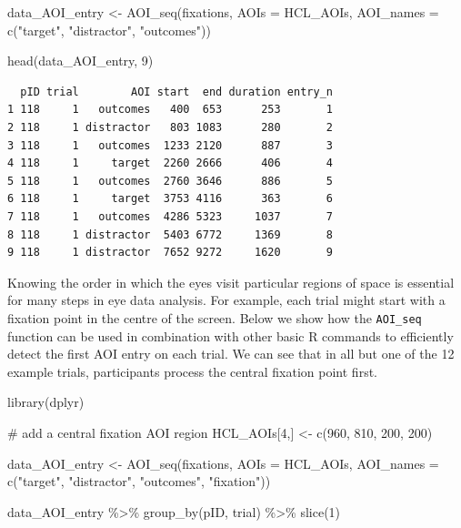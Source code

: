 \documentclass[
  man,
  floatsintext,
  longtable,
  nolmodern,
  notxfonts,
  notimes,
  colorlinks=true,linkcolor=blue,citecolor=blue,urlcolor=blue]{apa7}
\newenvironment{Shaded}{\begin{snugshade}}{\end{snugshade}}
\newcommand{\AttributeTok}[1]{\textcolor[rgb]{0.40,0.45,0.13}{#1}}
\newcommand{\CommentTok}[1]{\textcolor[rgb]{0.37,0.37,0.37}{#1}}
\newcommand{\DecValTok}[1]{\textcolor[rgb]{0.68,0.00,0.00}{#1}}
\newcommand{\FunctionTok}[1]{\textcolor[rgb]{0.28,0.35,0.67}{#1}}
\newcommand{\NormalTok}[1]{\textcolor[rgb]{0.00,0.23,0.31}{#1}}
\newcommand{\OtherTok}[1]{\textcolor[rgb]{0.00,0.23,0.31}{#1}}
\newcommand{\SpecialCharTok}[1]{\textcolor[rgb]{0.37,0.37,0.37}{#1}}
\newcommand{\StringTok}[1]{\textcolor[rgb]{0.13,0.47,0.30}{#1}}
\begin{document}
\begin{Shaded}
\begin{Highlighting}[]
\NormalTok{data\_AOI\_entry }\OtherTok{\textless{}{-}} 
  \FunctionTok{AOI\_seq}\NormalTok{(fixations, }
          \AttributeTok{AOIs =}\NormalTok{ HCL\_AOIs,}
          \AttributeTok{AOI\_names =} \FunctionTok{c}\NormalTok{(}\StringTok{"target"}\NormalTok{, }\StringTok{"distractor"}\NormalTok{, }\StringTok{"outcomes"}\NormalTok{))}

\FunctionTok{head}\NormalTok{(data\_AOI\_entry, }\DecValTok{9}\NormalTok{)}
\end{Highlighting}
\end{Shaded}

\begin{verbatim}
  pID trial        AOI start  end duration entry_n
1 118     1   outcomes   400  653      253       1
2 118     1 distractor   803 1083      280       2
3 118     1   outcomes  1233 2120      887       3
4 118     1     target  2260 2666      406       4
5 118     1   outcomes  2760 3646      886       5
6 118     1     target  3753 4116      363       6
7 118     1   outcomes  4286 5323     1037       7
8 118     1 distractor  5403 6772     1369       8
9 118     1 distractor  7652 9272     1620       9
\end{verbatim}

Knowing the order in which the eyes visit particular regions of space is
essential for many steps in eye data analysis. For example, each trial
might start with a fixation point in the centre of the screen. Below we
show how the \texttt{AOI\_seq} function can be used in combination with
other basic R commands to efficiently detect the first AOI entry on each
trial. We can see that in all but one of the 12 example trials,
participants process the central fixation point first.

\begin{Shaded}
\begin{Highlighting}[]
\FunctionTok{library}\NormalTok{(dplyr)}

\CommentTok{\# add a central fixation AOI region}
\NormalTok{HCL\_AOIs[}\DecValTok{4}\NormalTok{,] }\OtherTok{\textless{}{-}} \FunctionTok{c}\NormalTok{(}\DecValTok{960}\NormalTok{, }\DecValTok{810}\NormalTok{, }\DecValTok{200}\NormalTok{, }\DecValTok{200}\NormalTok{)}

\NormalTok{data\_AOI\_entry }\OtherTok{\textless{}{-}} 
  \FunctionTok{AOI\_seq}\NormalTok{(fixations, }
          \AttributeTok{AOIs =}\NormalTok{ HCL\_AOIs,}
          \AttributeTok{AOI\_names =} \FunctionTok{c}\NormalTok{(}\StringTok{"target"}\NormalTok{, }\StringTok{"distractor"}\NormalTok{, }\StringTok{"outcomes"}\NormalTok{, }\StringTok{"fixation"}\NormalTok{))}

\NormalTok{data\_AOI\_entry }\SpecialCharTok{\%\textgreater{}\%} 
  \FunctionTok{group\_by}\NormalTok{(pID, trial) }\SpecialCharTok{\%\textgreater{}\%} 
  \FunctionTok{slice}\NormalTok{(}\DecValTok{1}\NormalTok{)}
\end{Highlighting}
\end{Shaded}
\end{document}

